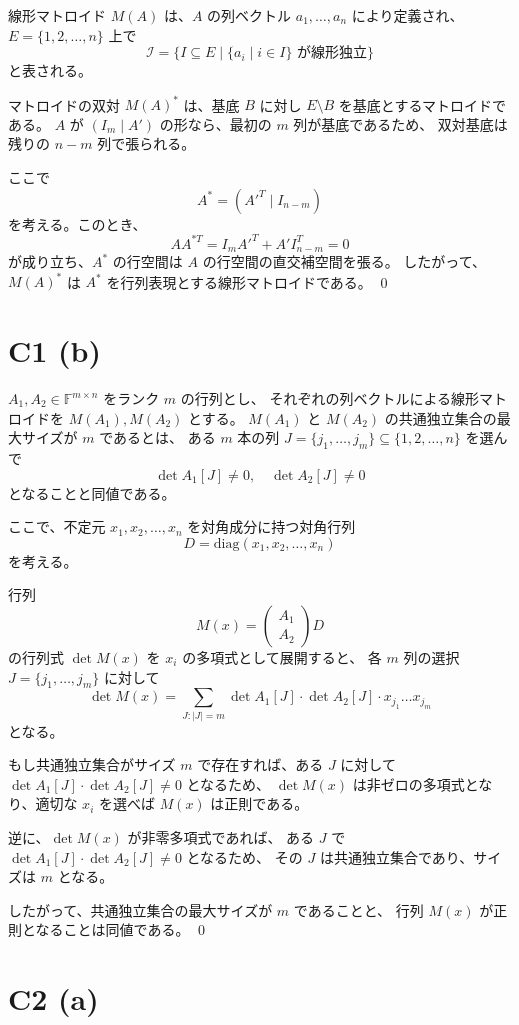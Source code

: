 \documentclass[a4paper]{ltjsarticle}
\begin{document}
線形マトロイド $M(A)$ は、$A$ の列ベクトル $a_1,\dots,a_n$ により定義され、
$E = \{1,2,\dots,n\}$ 上で
\[
  \mathcal{I} = \{ I \subseteq E \mid \{a_i \mid i \in I\} \text{ が線形独立} \}
\]
と表される。

\medskip
マトロイドの双対 $M(A)^*$ は、基底 $B$ に対し $E \setminus B$ を基底とするマトロイドである。
$A$ が $(I_m \mid A')$ の形なら、最初の $m$ 列が基底であるため、
双対基底は残りの $n-m$ 列で張られる。

ここで
\[
  A^* = ( A'^T \mid I_{n-m} )
\]
を考える。このとき、
\[
  A A^{*T} = I_m A'^T + A' I_{n-m}^T = 0
\]
が成り立ち、$A^*$ の行空間は $A$ の行空間の直交補空間を張る。
したがって、$M(A)^*$ は $A^*$ を行列表現とする線形マトロイドである。
\qed

\section*{C1 (b)}

$A_1, A_2 \in \mathbb{F}^{m \times n}$ をランク $m$ の行列とし、
それぞれの列ベクトルによる線形マトロイドを $M(A_1), M(A_2)$ とする。
$M(A_1)$ と $M(A_2)$ の共通独立集合の最大サイズが $m$ であるとは、
ある $m$ 本の列 $J = \{ j_1, \dots, j_m \} \subseteq \{1,2,\dots,n\}$ を選んで
\[
  \det A_1[J] \neq 0, \quad \det A_2[J] \neq 0
\]
となることと同値である。

ここで、不定元 $x_1, x_2, \dots, x_n$ を対角成分に持つ対角行列
\[
  D = \mathrm{diag}(x_1, x_2, \dots, x_n)
\]
を考える。

行列
\[
  M(x) = \begin{pmatrix}
    A_1 \\
    A_2
  \end{pmatrix} D
\]
の行列式 $\det M(x)$ を $x_i$ の多項式として展開すると、
各 $m$ 列の選択 $J = \{j_1, \dots, j_m\}$ に対して
\[
  \det M(x) = \sum_{J: |J| = m}
    \det A_1[J] \cdot \det A_2[J] \cdot x_{j_1} \dots x_{j_m}
\]
となる。

もし共通独立集合がサイズ $m$ で存在すれば、ある $J$ に対して
$\det A_1[J] \cdot \det A_2[J] \neq 0$ となるため、
$\det M(x)$ は非ゼロの多項式となり、適切な $x_i$ を選べば $M(x)$ は正則である。

逆に、$\det M(x)$ が非零多項式であれば、
ある $J$ で $\det A_1[J] \cdot \det A_2[J] \neq 0$ となるため、
その $J$ は共通独立集合であり、サイズは $m$ となる。

したがって、共通独立集合の最大サイズが $m$ であることと、
行列 $M(x)$ が正則となることは同値である。
\qed

\section*{C2 (a)}
\end{document}
